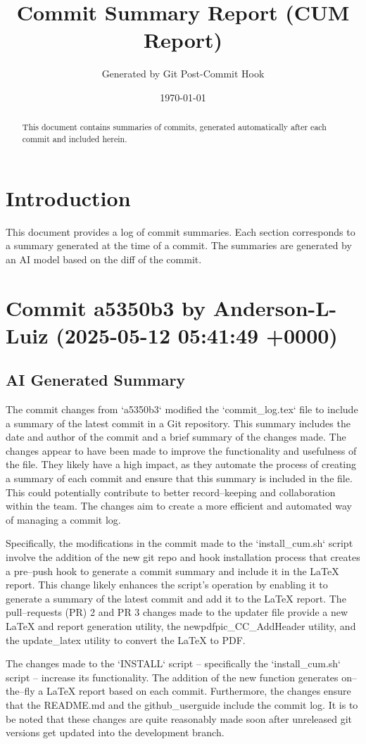 \documentclass{article}
\title{Commit Summary Report (CUM Report)}
\author{Generated by Git Post-Commit Hook}
\date{\today}
\begin{document}
\maketitle
\begin{abstract}
This document contains summaries of commits, generated automatically after each commit and included herein.
\end{abstract}
\tableofcontents
\newpage

\section{Introduction}
This document provides a log of commit summaries. Each section corresponds to a summary generated at the time of a commit.
The summaries are generated by an AI model based on the diff of the commit.

\section{Commit a5350b3 by Anderson-L-Luiz (2025-05-12 05:41:49 +0000)}
\subsection{AI Generated Summary}
{\selectfont
 The commit changes from `a5350b3` modified the `commit\_log.tex` file to include a summary of the latest commit in a Git repository. This summary includes the date and author of the commit and a brief summary of the changes made. The changes appear to have been made to improve the functionality and usefulness of the file. They likely have a high impact, as they automate the process of creating a summary of each commit and ensure that this summary is included in the file. This could potentially contribute to better record--keeping and collaboration within the team. The changes aim to create a more efficient and automated way of managing a commit log.

Specifically, the modifications in the commit made to the `install\_cum.sh` script involve the addition of the new git repo and hook installation process that creates a pre--push hook to generate a commit summary and include it in the LaTeX report. This change likely enhances the script's operation by enabling it to generate a summary of the latest commit and add it to the LaTeX report. The pull--requests (PR) 2 and PR 3 changes made to the updater file provide a new LaTeX and report generation utility, the newpdfpic\_CC\_AddHeader utility, and the update\_latex utility to convert the LaTeX to PDF. 

The changes made to the `INSTALL` script -- specifically the `install\_cum.sh` script -- increase its functionality. The addition of the new function generates on--the--fly a LaTeX report based on each commit. Furthermore, the changes ensure that the README.md and the github\_userguide include the commit log. It is to be noted that these changes are quite reasonably made soon after unreleased git versions get updated into the development branch.
}
\end{document}
